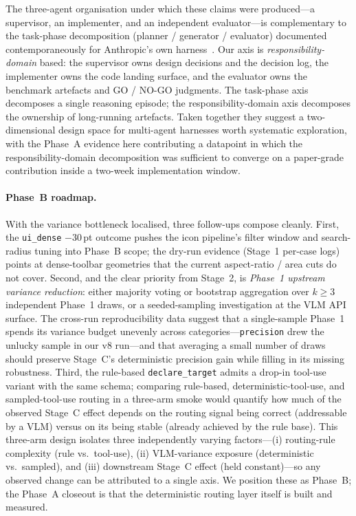 The three-agent organisation under which these claims were
produced---a supervisor, an implementer, and an independent
evaluator---is complementary to the task-phase decomposition
(planner / generator / evaluator) documented contemporaneously for
Anthropic's own harness~\cite{anthropic2026threeagentharness}.  Our
axis is \emph{responsibility-domain} based: the supervisor owns
design decisions and the decision log, the implementer owns the
code landing surface, and the evaluator owns the benchmark
artefacts and GO / NO-GO judgments.  The task-phase axis
decomposes a single reasoning episode; the responsibility-domain
axis decomposes the ownership of long-running artefacts.  Taken
together they suggest a two-dimensional design space for
multi-agent harnesses worth systematic exploration, with the
Phase~A evidence here contributing a datapoint in which the
responsibility-domain decomposition was sufficient to converge on
a paper-grade contribution inside a two-week implementation
window.

\paragraph{Phase~B roadmap.}
With the variance bottleneck localised, three follow-ups compose
cleanly.  First, the \texttt{ui\_dense} $-30$\,pt outcome pushes
the icon pipeline's filter window and search-radius tuning into
Phase~B scope; the dry-run evidence (Stage~1 per-case logs) points
at dense-toolbar geometries that the current aspect-ratio /
area cuts do not cover.  Second, and the clear priority from
Stage~2, is \emph{Phase~1 upstream variance reduction}: either
majority voting or bootstrap aggregation over $k \geq 3$
independent Phase~1 draws, or a seeded-sampling investigation at
the VLM API surface.  The cross-run reproducibility data suggest
that a single-sample Phase~1 spends its variance budget unevenly
across categories---\texttt{precision} drew the unlucky sample in
our v8 run---and that averaging a small number of draws should
preserve Stage~C's deterministic precision gain while filling in
its missing robustness.  Third, the rule-based \texttt{declare\_target}
admits a drop-in tool-use variant with the same schema; comparing
rule-based, deterministic-tool-use, and sampled-tool-use routing in
a three-arm smoke would quantify how much of the observed Stage~C
effect depends on the routing signal being correct (addressable by
a VLM) versus on its being stable (already achieved by the rule
base).  This three-arm design isolates three independently varying
factors---(i) routing-rule complexity (rule vs.\ tool-use),
(ii) VLM-variance exposure (deterministic vs.\ sampled), and
(iii) downstream Stage~C effect (held constant)---so any observed
change can be attributed to a single axis.  We position these as Phase~B; the Phase~A closeout is that
the deterministic routing layer itself is built and measured.


